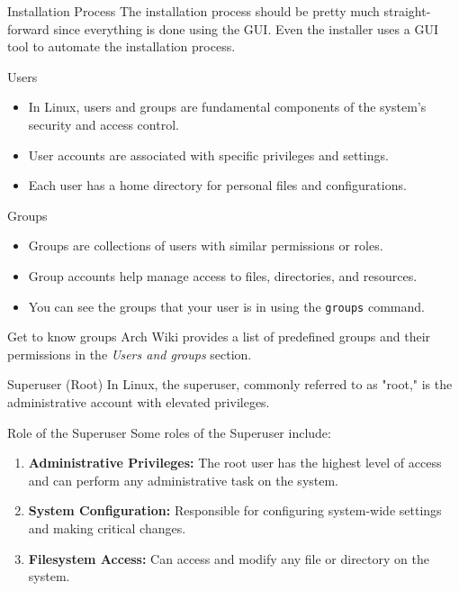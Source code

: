 \documentclass{beamer}
\begin{document}
\begin{frame}{Installation Process}
	The installation process should be pretty much straight-forward since everything is done using the
	GUI. Even the installer uses a GUI tool to automate the installation process.
\end{frame}

\begin{frame}{Users}
	\begin{itemize}
		\item In Linux, users and groups are fundamental components of the system's security and access control.

		\item User accounts are associated with specific privileges and settings.

		\item Each user has a home directory for personal files and configurations.
		\end{itemize}
\end{frame}

\begin{frame}{Groups}
	\begin{itemize}
		\item Groups are collections of users with similar permissions or roles.

		\item Group accounts help manage access to files, directories, and resources.
		\item You can see the groups that your user is in using the \texttt{groups}
	command.
\end{itemize}
\end{frame}

\begin{frame}{Get to know groups}
	Arch Wiki provides a list of predefined groups and their permissions
	in the \textit{Users and groups} section.
\end{frame}

\begin{frame}{Superuser (Root)}
	    In Linux, the superuser, commonly referred to as "root," is the administrative account with elevated privileges.
\end{frame}

\begin{frame}{Role of the Superuser}
	Some roles of the Superuser include:
	\begin{enumerate}
		\item \textbf{Administrative Privileges:}     The root user has the highest level of access and can perform any administrative task on the system.
		\item \textbf{System Configuration:}     Responsible for configuring system-wide settings and making critical changes.
		\item \textbf{Filesystem Access:}     Can access and modify any file or directory on the system.
	\end{enumerate}
\end{frame}
\end{document}
